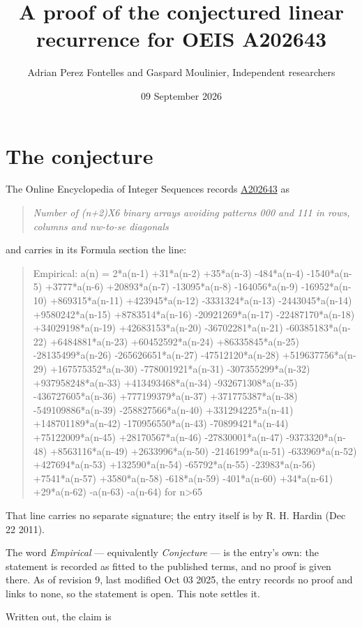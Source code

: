 \documentclass[11pt]{article}
\title{A proof of the conjectured linear recurrence for OEIS A202643}
\author{Adrian Perez Fontelles and Gaspard Moulinier, Independent researchers}
\date{09 September 2026}
\theoremstyle{definition}
\begin{document}
\maketitle
\section{The conjecture}

The Online Encyclopedia of Integer Sequences records \href{https://oeis.org/A202643}{A202643} as

\begin{quote}\itshape Number of (n+2)X6 binary arrays avoiding patterns 000 and 111 in rows, columns and nw-to-se diagonals\end{quote}

and carries in its Formula section the line:

\begin{quote}\ttfamily Empirical: a(n) = 2*a(n-1) +31*a(n-2) +35*a(n-3) -484*a(n-4) -1540*a(n-5) +3777*a(n-6) +20893*a(n-7) -13095*a(n-8) -164056*a(n-9) -16952*a(n-10) +869315*a(n-11) +423945*a(n-12) -3331324*a(n-13) -2443045*a(n-14) +9580242*a(n-15) +8783514*a(n-16) -20921269*a(n-17) -22487170*a(n-18) +34029198*a(n-19) +42683153*a(n-20) -36702281*a(n-21) -60385183*a(n-22) +6484881*a(n-23) +60452592*a(n-24) +86335845*a(n-25) -28135499*a(n-26) -265626651*a(n-27) -47512120*a(n-28) +519637756*a(n-29) +167575352*a(n-30) -778001921*a(n-31) -307355299*a(n-32) +937958248*a(n-33) +413493468*a(n-34) -932671308*a(n-35) -436727605*a(n-36) +777199379*a(n-37) +371775387*a(n-38) -549109886*a(n-39) -258827566*a(n-40) +331294225*a(n-41) +148701189*a(n-42) -170956550*a(n-43) -70899421*a(n-44) +75122009*a(n-45) +28170567*a(n-46) -27830001*a(n-47) -9373320*a(n-48) +8563116*a(n-49) +2633996*a(n-50) -2146199*a(n-51) -633969*a(n-52) +427694*a(n-53) +132590*a(n-54) -65792*a(n-55) -23983*a(n-56) +7541*a(n-57) +3580*a(n-58) -618*a(n-59) -401*a(n-60) +34*a(n-61) +29*a(n-62) -a(n-63) -a(n-64) for n>65\end{quote}

That line carries no separate signature; the entry itself is by R. H. Hardin (Dec 22 2011).

The word {\itshape Empirical} --- equivalently {\itshape Conjecture} --- is the entry's own: the statement is recorded as fitted to the published terms, and no proof is given there. As of revision 9, last modified Oct 03 2025, the entry records no proof and links to none, so the statement is open. This note settles it.

Written out, the claim is
\end{document}
